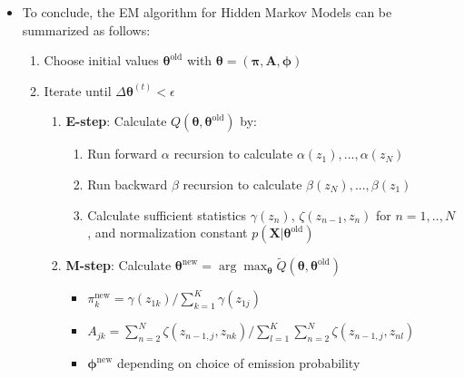 \begin{itemize}
	\item To conclude, the EM algorithm for Hidden Markov Models can be summarized as follows:
	\begin{tcolorbox}[colback=white!80!gray,colframe=gray!75!black,title=EM for HMM]
		\begin{enumerate}
			\item Choose initial values $\bm{\theta}^{\text{old}}$ with $\bm{\theta}=(\bm{\pi}, \bm{A}, \bm{\phi})$
			\item Iterate until $\Delta \bm{\theta}^{(t)} < \epsilon$
			\begin{enumerate}
				\item \textbf{E-step}: Calculate $Q(\bm{\theta}, \bm{\theta}^{\text{old}})$ by:
				\begin{enumerate}
					\item Run forward $\alpha$ recursion to calculate $\alpha(z_1),...,\alpha(z_N)$
					\item Run backward $\beta$ recursion to calculate $\beta(z_N),...,\beta(z_1)$
					\item Calculate sufficient statistics $\gamma(z_n)$, $\zeta(z_{n-1},z_n)$ for $n=1,..,N$, and normalization constant $p(\bm{X}|\bm{\theta}^{\text{old}})$
				\end{enumerate}
				\item \textbf{M-step}: Calculate $\bm{\theta}^{\text{new}}=\arg\max_{\bm{\theta}} \tilde{Q}(\bm{\theta}, \bm{\theta}^{\text{old}})$
				\begin{itemize}
					\item $\pi_k^{\text{new}}=\gamma(z_{1k})/\sum_{k=1}^{K}\gamma(z_{1j})$
					\item $A_{jk}=\sum_{n=2}^{N} \zeta(z_{n-1,j}, z_{nk})/\sum_{l=1}^{K}\sum_{n=2}^{N} \zeta(z_{n-1,j}, z_{nl})$
					\item $\bm{\phi}^{\text{new}}$ depending on choice of emission probability
				\end{itemize}
			\end{enumerate}
		\end{enumerate}
	\end{tcolorbox}
\end{itemize}
